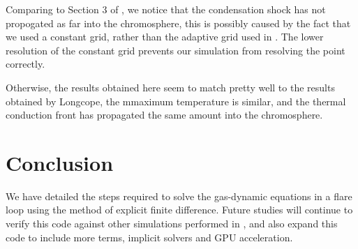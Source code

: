 \documentclass[iop]{emulateapj}
\begin{document}
		Comparing to Section 3 of \cite{2014ApJ...795...10L}, we notice that the condensation shock has not propogated as far into the chromosphere, this is possibly caused by the fact that we used a constant grid, rather than the adaptive grid used in \cite{2014ApJ...795...10L}. The lower resolution of the constant grid prevents our simulation from resolving the point correctly.
		
		Otherwise, the results obtained here seem to match pretty well to the results obtained by Longcope, the mmaximum temperature is similar, and the thermal conduction front has propagated the same amount into the chromosphere.
	
	\section{Conclusion}
	
		We have detailed the steps required to solve the gas-dynamic equations in a flare loop using the method of explicit finite difference. Future studies will continue to verify this code against other simulations performed in \cite{2014ApJ...795...10L}, and also expand this code to include more terms, implicit solvers and GPU acceleration.

	
	
	
\end{document}
